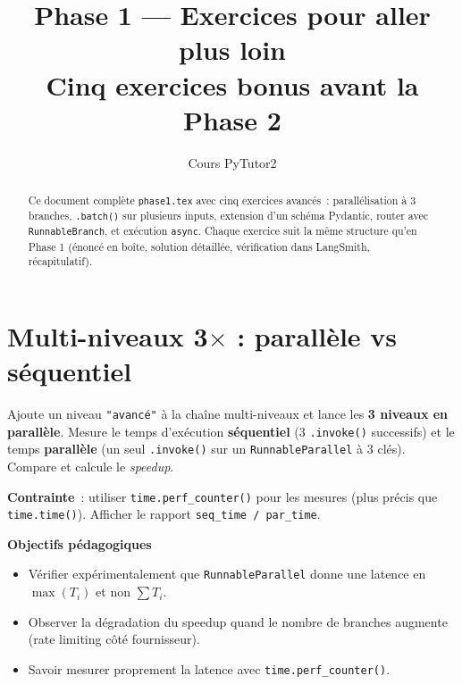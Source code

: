\documentclass[11pt,a4paper]{article}
\title{\textbf{Phase 1 — Exercices pour aller plus loin}\\
\large Cinq exercices bonus avant la Phase 2}
\author{Cours PyTutor2}
\date{}
\begin{document}
\maketitle

\begin{abstract}
\noindent
Ce document complète \texttt{phase1.tex} avec cinq exercices avancés~:
parallélisation à 3 branches, \texttt{.batch()} sur plusieurs inputs,
extension d'un schéma Pydantic, router avec \texttt{RunnableBranch}, et
exécution \texttt{async}. Chaque exercice suit la même structure
qu'en Phase 1 (énoncé en boîte, solution détaillée, vérification dans
LangSmith, récapitulatif).
\end{abstract}

\tableofcontents
\bigskip

\section{Multi-niveaux 3$\times$ : parallèle vs séquentiel}

\begin{tcolorbox}[title=Exercice bonus 1. Mesurer le speedup d'un \texttt{RunnableParallel} à 3 branches]
Ajoute un niveau \texttt{"avancé"} à la chaîne multi-niveaux et lance les
\textbf{3 niveaux en parallèle}. Mesure le temps d'exécution
\textbf{séquentiel} (3 \texttt{.invoke()} successifs) et le temps
\textbf{parallèle} (un seul \texttt{.invoke()} sur un \texttt{RunnableParallel}
à 3 clés). Compare et calcule le \emph{speedup}.

\textbf{Contrainte}~: utiliser \texttt{time.perf\_counter()} pour les
mesures (plus précis que \texttt{time.time()}). Afficher le rapport
\texttt{seq\_time / par\_time}.

\bigskip
\noindent\textbf{Objectifs pédagogiques}
\begin{itemize}[leftmargin=*]
  \item Vérifier expérimentalement que \texttt{RunnableParallel} donne une
        latence en $\max(T_i)$ et non $\sum T_i$.
  \item Observer la dégradation du speedup quand le nombre de branches
        augmente (rate limiting côté fournisseur).
  \item Savoir mesurer proprement la latence avec
        \texttt{time.perf\_counter()}.
\end{itemize}
\end{tcolorbox}
\end{document}
